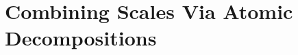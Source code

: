 \documentclass[12pt]{report}
\theoremstyle{plain}
\theoremstyle{remark}
\numberwithin{equation}{section}
\begin{document}
\chapter{Combining Scales Via Atomic Decompositions} \label{chap:spectralatomicdchapter}


\renewcommand\chaptername{Appendix}


%

%

\newpage
\singlespacing
{}
\printbibliography
\end{document}
